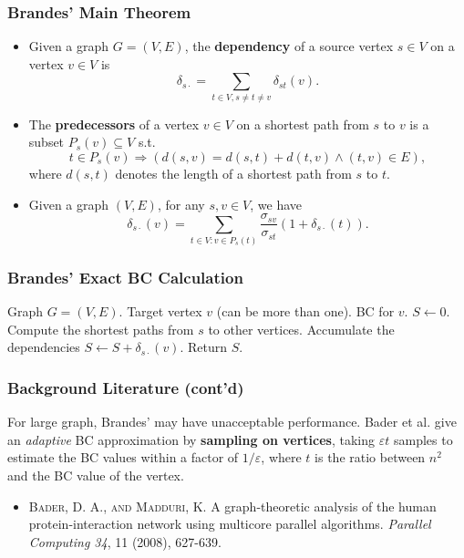 \documentclass[12pt]{beamer}
\begin{document}
\begin{frame}
	\frametitle{Brandes' Main Theorem}
	\begin{itemize}
	\item Given a graph $G=(V,E)$, the {\bf dependency} of a source vertex $s\in V$ on a vertex $v\in V$ is
	$$
	\delta_{s\cdot} = \sum_{t\in V, s\not= t\not= v} \delta_{st}(v).
	$$

	\item The {\bf predecessors} of a vertex $v\in V$ on a shortest path from $s$ to $v$ is a subset $P_s(v)\subseteq V$ s.t.
	$$t\in P_s(v) \Rightarrow \left( d(s,v) = d(s,t) + d(t,v) \wedge (t,v)\in E \right),$$
	where $d(s,t)$ denotes the length of a shortest path from $s$ to $t$.
	
	\item Given a graph $(V,E)$, for any $s,v\in V$, we have
	$$
	\delta_{s\cdot}(v) = \sum_{t\in V: v\in P_s(t)} \frac{\sigma_{sv}}{\sigma_{st}}(1+\delta_{s\cdot}(t)).
	$$
	\end{itemize}
\end{frame}

\begin{frame}
	\frametitle{Brandes' Exact BC Calculation}
	\begin{algorithmic}
	\Require Graph $G=(V, E)$. Target vertex $v$ (can be more than one).
	\Ensure BC for $v$.
	\State $S\gets 0$.
	\State Compute the shortest paths from $s$ to other vertices. Accumulate the dependencies $S \gets S + \delta_{s\cdot}(v)$.
	\EndFor
	\State Return $S$.
	\end{algorithmic}
\end{frame}

\begin{frame}
	\frametitle{Background Literature (cont'd)}
	For large graph, Brandes' may have unacceptable performance. Bader et al. give an {\it adaptive} BC approximation by {\bf sampling on vertices}, taking $\varepsilon t$ samples to estimate the BC values within a factor of $1/\varepsilon$, where $t$ is the ratio between $n^2$ and the BC value of the vertex.
	
	\begin{itemize}
		\item \textsc{Bader, D. A., and Madduri, K}. A graph-theoretic analysis of the human protein-interaction network using multicore parallel algorithms. {\it Parallel Computing 34}, 11 (2008), 627-639.
	\end{itemize}
\end{frame}
\end{document}
